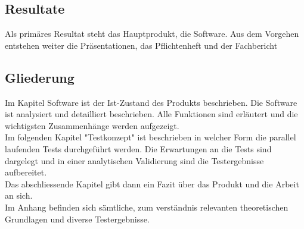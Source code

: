\subsection{Resultate}\label{subsec:resultate}
Als primäres Resultat steht das Hauptprodukt, die Software. Aus dem Vorgehen entstehen weiter die Präsentationen, das Pflichtenheft und der Fachbericht

\subsection{Gliederung} \label{subsec:gliederung}
Im Kapitel Software ist der Ist-Zustand des Produkts beschrieben. Die Software ist analysiert und detailliert beschrieben. Alle Funktionen sind erläutert und die wichtigsten Zusammenhänge werden aufgezeigt. \\Im folgenden Kapitel "Testkonzept" ist beschrieben in welcher Form die parallel laufenden Tests durchgeführt werden. Die Erwartungen an die Tests sind dargelegt und in einer analytischen Validierung sind die Testergebnisse aufbereitet. \\Das abschliessende Kapitel gibt dann ein Fazit über das Produkt und die Arbeit an sich. \\Im Anhang befinden sich sämtliche, zum verständnis relevanten theoretischen Grundlagen und diverse Testergebnisse.




